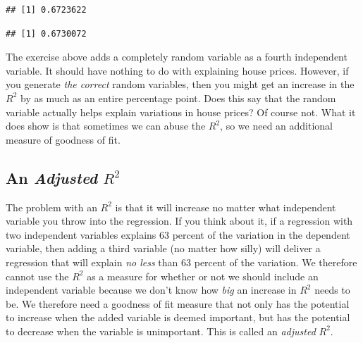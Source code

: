 \documentclass[
]{book}
\newenvironment{Shaded}{\begin{snugshade}}{\end{snugshade}}
\newcommand{\AttributeTok}[1]{\textcolor[rgb]{0.77,0.63,0.00}{#1}}
\newcommand{\FunctionTok}[1]{\textcolor[rgb]{0.00,0.00,0.00}{#1}}
\newcommand{\NormalTok}[1]{#1}
\newcommand{\OtherTok}[1]{\textcolor[rgb]{0.56,0.35,0.01}{#1}}
\newcommand{\SpecialCharTok}[1]{\textcolor[rgb]{0.00,0.00,0.00}{#1}}
\begin{document}
\begin{Shaded}
\end{Shaded}

\begin{verbatim}
## [1] 0.6723622
\end{verbatim}

\begin{Shaded}
\end{Shaded}

\begin{verbatim}
## [1] 0.6730072
\end{verbatim}

The exercise above adds a completely random variable as a fourth independent variable. It should have nothing to do with explaining house prices. However, if you generate \emph{the correct} random variables, then you might get an increase in the \(R^2\) by as much as an entire percentage point. Does this say that the random variable actually helps explain variations in house prices? Of course not. What it does show is that sometimes we can abuse the \(R^2\), so we need an additional measure of goodness of fit.

\hypertarget{an-adjusted-r2}{%
\subsection{\texorpdfstring{An \emph{Adjusted} \(R^2\)}{An Adjusted R\^{}2}}\label{an-adjusted-r2}}

The problem with an \(R^2\) is that it will increase no matter what independent variable you throw into the regression. If you think about it, if a regression with two independent variables explains 63 percent of the variation in the dependent variable, then adding a third variable (no matter how silly) will deliver a regression that will explain \emph{no less} than 63 percent of the variation. We therefore cannot use the \(R^2\) as a measure for whether or not we should include an independent variable because we don't know how \emph{big} an increase in \(R^2\) needs to be. We therefore need a goodness of fit measure that not only has the potential to increase when the added variable is deemed important, but has the potential to decrease when the variable is unimportant. This is called an \emph{adjusted} \(R^2\).
\end{document}
